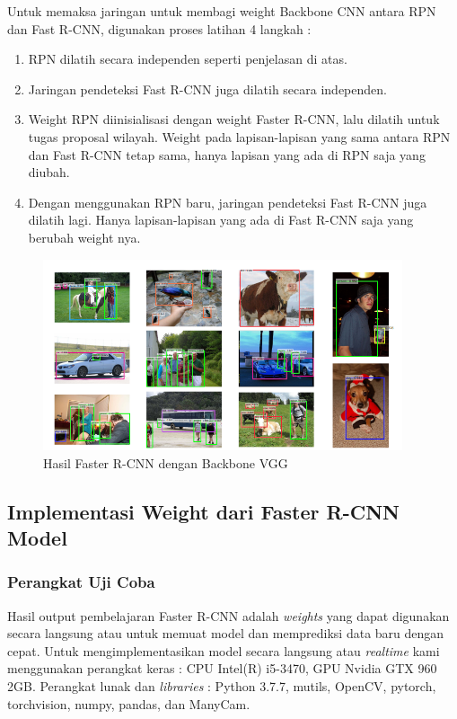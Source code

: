 \documentclass{article}
\begin{document}
   	\par Untuk memaksa jaringan untuk membagi weight Backbone CNN antara RPN dan Fast R-CNN, digunakan proses latihan 4 langkah :
   	\begin{enumerate}
   		\item RPN dilatih secara independen seperti penjelasan di atas.
   		\item Jaringan pendeteksi Fast R-CNN juga dilatih secara independen.
   		\item Weight RPN diinisialisasi dengan weight Faster R-CNN, lalu dilatih untuk tugas proposal wilayah. Weight pada lapisan-lapisan yang sama antara RPN dan Fast R-CNN tetap sama, hanya lapisan yang ada di RPN saja yang diubah.
   		\item Dengan menggunakan RPN baru, jaringan pendeteksi Fast R-CNN juga dilatih lagi. Hanya lapisan-lapisan yang ada di Fast R-CNN saja yang berubah weight nya. 
   	\end{enumerate}
   	
   	\begin{figure}[H]
   		\centering
   		\includegraphics[width=400px]{arsitektur/contoh_hasil.png}
   		\caption{Hasil Faster R-CNN dengan Backbone VGG}
   	\end{figure}
   	
   	\newpage
  	\subsection{Implementasi Weight dari Faster R-CNN Model}
  	\subsubsection{Perangkat Uji Coba}
	\par Hasil output pembelajaran Faster R-CNN adalah \textit{weights} yang dapat digunakan secara langsung atau untuk memuat model dan memprediksi data baru dengan cepat. Untuk mengimplementasikan model secara langsung atau \textit{realtime} kami menggunakan perangkat keras : CPU Intel(R) i5-3470, GPU Nvidia GTX 960 2GB. Perangkat lunak dan \textit{libraries} : Python 3.7.7, mutils, OpenCV, pytorch, torchvision, numpy, pandas, dan ManyCam. 
	
\end{document}
